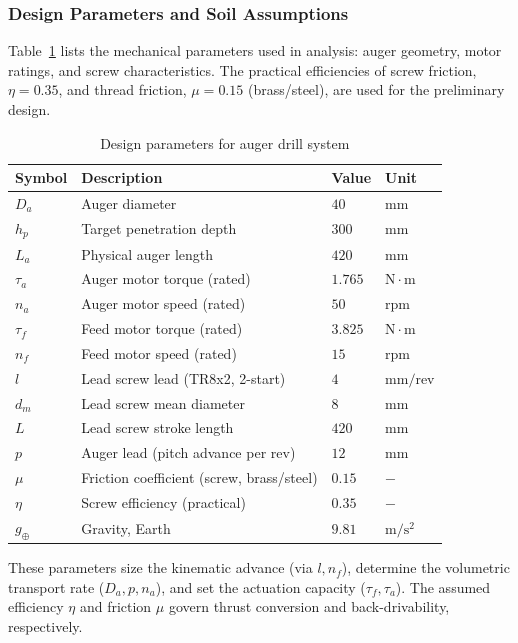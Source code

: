 \documentclass[letterpaper, 10 pt, conference]{ieeeconf}  %
\begin{document}
\subsubsection*{Design Parameters and Soil Assumptions}
Table~\ref{tab:design} lists the mechanical parameters used in analysis: auger geometry, motor ratings, and screw characteristics. The practical efficiencies of screw friction, \(\eta=0.35\), and thread friction, \(\mu=0.15\) (brass/steel), are used for the preliminary design.

\begin{table}[h!]
\centering
\caption{Design parameters  for auger drill system}
\label{tab:design}
\begin{tabular}{@{}llll@{}}
\toprule
\textbf{Symbol} & \textbf{Description} & \textbf{Value} & \textbf{Unit} \\
\midrule
\(D_a\) & Auger diameter & \(40\) & \(\mathrm{mm}\) \\
\(h_p\) & Target penetration depth & \(300\) & \(\mathrm{mm}\) \\
\(L_a\) & Physical auger length & \(420\) & \(\mathrm{mm}\) \\
\(\tau_a\) & Auger motor torque (rated) & \(1.765\) & \(\mathrm{N\cdot m}\) \\
\(n_a\) & Auger motor speed (rated) & \(50\) & \(\mathrm{rpm}\) \\
\(\tau_f\) & Feed motor torque (rated) & \(3.825\) & \(\mathrm{N\cdot m}\) \\
\(n_f\) & Feed motor speed (rated) & \(15\) & \(\mathrm{rpm}\) \\
\(l\) & Lead screw lead (TR8x2, 2-start) & \(4\) & \(\mathrm{mm/rev}\) \\
\(d_m\) & Lead screw mean diameter & \(8\) & \(\mathrm{mm}\) \\
\(L\) & Lead screw stroke length & \(420\) & \(\mathrm{mm}\) \\
\(p\) & Auger lead (pitch advance per rev) & \(12\) & \(\mathrm{mm}\) \\
\(\mu\) & Friction coefficient (screw, brass/steel) & \(0.15\) & \(-\) \\
\(\eta\) & Screw efficiency (practical) & \(0.35\) & \(-\) \\
\(g_{\oplus}\) & Gravity, Earth & \(9.81\) & \(\mathrm{m/s^2}\) \\
\bottomrule
\end{tabular}
\end{table}


These parameters size the kinematic advance (via \(l,n_f\)), determine the volumetric transport rate (\(D_a,p,n_a\)), and set the actuation capacity (\(\tau_f,\tau_a\)). The assumed efficiency \(\eta\) and friction \(\mu\) govern thrust conversion and back-drivability, respectively.
\end{document}
